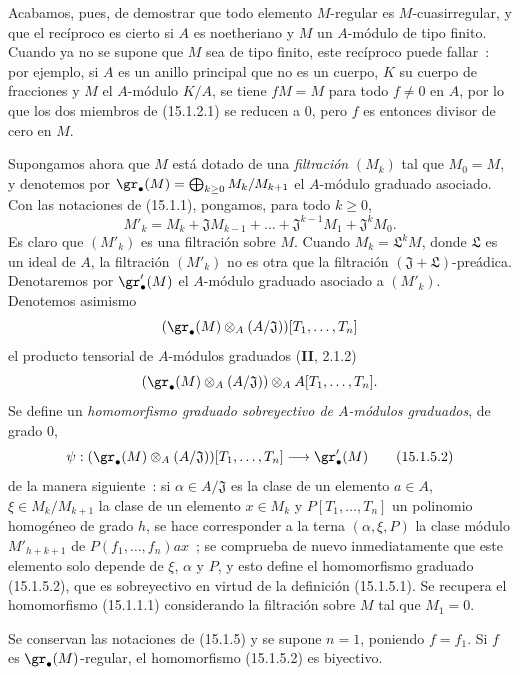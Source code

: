 Acabamos, pues, de demostrar que todo elemento $M$-regular es
$M$-cuasirregular, y que el recíproco es cierto si $A$ es noetheriano y $M$
un $A$-módulo de tipo finito. Cuando ya no se supone que $M$ sea de tipo
finito, este recíproco puede fallar~: por ejemplo, si $A$ es un anillo
principal que no es un cuerpo, $K$ su cuerpo de fracciones y $M$ el
$A$-módulo $K/A$, se tiene $fM=M$ para todo $f\neq0$ en $A$, por lo que los
dos miembros de (15.1.2.1) se reducen a $0$, pero $f$ es entonces divisor de
cero en $M$.

\begin{env}[15.1.5]
\label{0.15.1.5-es}
Supongamos ahora que $M$ está dotado de una \emph{filtración} $(M_k)$ tal que
$M_0=M$, y denotemos por
$\gr_\bullet(M)=\bigoplus_{k\geq0}M_k/M_{k+1}$ el $A$-módulo graduado asociado.
Con las notaciones de (15.1.1), pongamos, para todo $k\geq0$,
\[
  M'_k=M_k+\mathfrak{J}M_{k-1}+\ldots+
  \mathfrak{J}^{k-1}M_1+\mathfrak{J}^kM_0.
  \tag{15.1.5.1}\label{0.15.1.5.1-es}
\]
Es claro que $(M'_k)$ es una filtración sobre $M$. Cuando
$M_k=\mathfrak L^kM$, donde $\mathfrak L$ es un ideal de $A$, la filtración
$(M'_k)$ no es otra que la filtración
$(\mathfrak{J}+\mathfrak L)$-preádica. Denotaremos por
$\gr'_\bullet(M)$ el $A$-módulo graduado asociado a $(M'_k)$. Denotemos asimismo
\[
  (\gr_\bullet(M)\otimes_A(A/\mathfrak{J}))[T_1,\ldots,T_n]
\]
el producto tensorial de $A$-módulos graduados (\textbf{II}, 2.1.2)
\[
  (\gr_\bullet(M)\otimes_A(A/\mathfrak{J}))
  \otimes_A A[T_1,\ldots,T_n].
\]
Se define un \emph{homomorfismo graduado sobreyectivo de $A$-módulos graduados},
de grado $0$,
\[
  \psi:(\gr_\bullet(M)\otimes_A(A/\mathfrak{J}))[T_1,\ldots,T_n]
  \longrightarrow\gr'_\bullet(M)
  \tag{15.1.5.2}\label{0.15.1.5.2-es}
\]
de la manera siguiente~: si $\alpha\in A/\mathfrak{J}$ es la clase de un
elemento $a\in A$, $\xi\in M_k/M_{k+1}$ la clase de un elemento $x\in M_k$ y
$P[T_1,\ldots,T_n]$ un polinomio homogéneo de grado $h$, se hace corresponder
a la terna $(\alpha,\xi,P)$ la clase módulo $M'_{h+k+1}$ de
$P(f_1,\ldots,f_n)ax$~; se comprueba de nuevo inmediatamente que este elemento
solo depende de $\xi$, $\alpha$ y $P$, y esto define el homomorfismo graduado
(15.1.5.2), que es sobreyectivo en virtud de la definición (15.1.5.1). Se
recupera el homomorfismo (15.1.1.1) considerando la filtración sobre $M$ tal
que $M_1=0$.
\end{env}

\begin{lemma}[15.1.6]
\label{0.15.1.6-es}
Se conservan las notaciones de (15.1.5) y se supone $n=1$, poniendo $f=f_1$.
Si $f$ es $\gr_\bullet(M)$-regular, el homomorfismo (15.1.5.2) es biyectivo.
\end{lemma}

